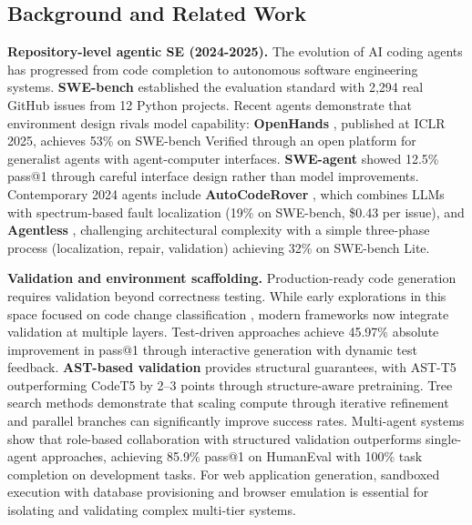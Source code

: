 \documentclass[conference]{IEEEtran}
\begin{document}

\subsection{Background and Related Work}

\textbf{Repository-level agentic SE (2024-2025).} The evolution of AI coding agents has progressed from code completion to autonomous software engineering systems. \textbf{SWE-bench} \cite{jimenez2024swe} established the evaluation standard with 2,294 real GitHub issues from 12 Python projects. Recent agents demonstrate that environment design rivals model capability: \textbf{OpenHands} \cite{wang2024openhands}, published at ICLR 2025, achieves 53\% on SWE-bench Verified through an open platform for generalist agents with agent-computer interfaces. \textbf{SWE-agent} \cite{yang2024swe} showed 12.5\% pass@1 through careful interface design rather than model improvements. Contemporary 2024 agents include \textbf{AutoCodeRover} \cite{zhang2024autocoder}, which combines LLMs with spectrum-based fault localization (19\% on SWE-bench, \$0.43 per issue), and \textbf{Agentless} \cite{xia2024agentless}, challenging architectural complexity with a simple three-phase process (localization, repair, validation) achieving 32\% on SWE-bench Lite.

\textbf{Validation and environment scaffolding.} Production-ready code generation requires validation beyond correctness testing. While early explorations in this space focused on code change classification \cite{kniazev2008automated}, modern frameworks now integrate validation at multiple layers. Test-driven approaches \cite{pan2024ticoder} achieve 45.97\% absolute improvement in pass@1 through interactive generation with dynamic test feedback. \textbf{AST-based validation} \cite{gong2024astt5} provides structural guarantees, with AST-T5 outperforming CodeT5 by 2--3 points through structure-aware pretraining. Tree search methods \cite{li2025s} demonstrate that scaling compute through iterative refinement and parallel branches can significantly improve success rates. Multi-agent systems \cite{hong2023metagpt} show that role-based collaboration with structured validation outperforms single-agent approaches, achieving 85.9\% pass@1 on HumanEval with 100\% task completion on development tasks. For web application generation, sandboxed execution with database provisioning and browser emulation is essential for isolating and validating complex multi-tier systems.
\end{document}
